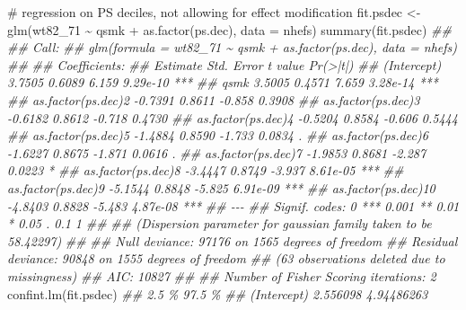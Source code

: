 \documentclass[
  10pt,
  a4paper,
]{book}
\newenvironment{Shaded}{\begin{snugshade}}{\end{snugshade}}
\newcommand{\AttributeTok}[1]{\textcolor[rgb]{0.40,0.45,0.13}{#1}}
\newcommand{\CommentTok}[1]{\textcolor[rgb]{0.37,0.37,0.37}{#1}}
\newcommand{\DocumentationTok}[1]{\textcolor[rgb]{0.37,0.37,0.37}{\textit{#1}}}
\newcommand{\FunctionTok}[1]{\textcolor[rgb]{0.28,0.35,0.67}{#1}}
\newcommand{\NormalTok}[1]{\textcolor[rgb]{0.00,0.46,0.62}{#1}}
\newcommand{\OtherTok}[1]{\textcolor[rgb]{0.00,0.46,0.62}{#1}}
\newcommand{\SpecialCharTok}[1]{\textcolor[rgb]{0.37,0.37,0.37}{#1}}
\begin{document}
\begin{Shaded}
\begin{Highlighting}[]
\CommentTok{\# regression on PS deciles, not allowing for effect modification}
\NormalTok{fit.psdec }\OtherTok{\textless{}{-}} \FunctionTok{glm}\NormalTok{(wt82\_71 }\SpecialCharTok{\textasciitilde{}}\NormalTok{ qsmk }\SpecialCharTok{+} \FunctionTok{as.factor}\NormalTok{(ps.dec), }\AttributeTok{data =}\NormalTok{ nhefs)}
\FunctionTok{summary}\NormalTok{(fit.psdec)}
\DocumentationTok{\#\# }
\DocumentationTok{\#\# Call:}
\DocumentationTok{\#\# glm(formula = wt82\_71 \textasciitilde{} qsmk + as.factor(ps.dec), data = nhefs)}
\DocumentationTok{\#\# }
\DocumentationTok{\#\# Coefficients:}
\DocumentationTok{\#\#                     Estimate Std. Error t value Pr(\textgreater{}|t|)    }
\DocumentationTok{\#\# (Intercept)           3.7505     0.6089   6.159 9.29e{-}10 ***}
\DocumentationTok{\#\# qsmk                  3.5005     0.4571   7.659 3.28e{-}14 ***}
\DocumentationTok{\#\# as.factor(ps.dec)2   {-}0.7391     0.8611  {-}0.858   0.3908    }
\DocumentationTok{\#\# as.factor(ps.dec)3   {-}0.6182     0.8612  {-}0.718   0.4730    }
\DocumentationTok{\#\# as.factor(ps.dec)4   {-}0.5204     0.8584  {-}0.606   0.5444    }
\DocumentationTok{\#\# as.factor(ps.dec)5   {-}1.4884     0.8590  {-}1.733   0.0834 .  }
\DocumentationTok{\#\# as.factor(ps.dec)6   {-}1.6227     0.8675  {-}1.871   0.0616 .  }
\DocumentationTok{\#\# as.factor(ps.dec)7   {-}1.9853     0.8681  {-}2.287   0.0223 *  }
\DocumentationTok{\#\# as.factor(ps.dec)8   {-}3.4447     0.8749  {-}3.937 8.61e{-}05 ***}
\DocumentationTok{\#\# as.factor(ps.dec)9   {-}5.1544     0.8848  {-}5.825 6.91e{-}09 ***}
\DocumentationTok{\#\# as.factor(ps.dec)10  {-}4.8403     0.8828  {-}5.483 4.87e{-}08 ***}
\DocumentationTok{\#\# {-}{-}{-}}
\DocumentationTok{\#\# Signif. codes:  0 \textquotesingle{}***\textquotesingle{} 0.001 \textquotesingle{}**\textquotesingle{} 0.01 \textquotesingle{}*\textquotesingle{} 0.05 \textquotesingle{}.\textquotesingle{} 0.1 \textquotesingle{} \textquotesingle{} 1}
\DocumentationTok{\#\# }
\DocumentationTok{\#\# (Dispersion parameter for gaussian family taken to be 58.42297)}
\DocumentationTok{\#\# }
\DocumentationTok{\#\#     Null deviance: 97176  on 1565  degrees of freedom}
\DocumentationTok{\#\# Residual deviance: 90848  on 1555  degrees of freedom}
\DocumentationTok{\#\#   (63 observations deleted due to missingness)}
\DocumentationTok{\#\# AIC: 10827}
\DocumentationTok{\#\# }
\DocumentationTok{\#\# Number of Fisher Scoring iterations: 2}
\FunctionTok{confint.lm}\NormalTok{(fit.psdec)}
\DocumentationTok{\#\#                         2.5 \%      97.5 \%}
\DocumentationTok{\#\# (Intercept)          2.556098  4.94486263}

\end{Highlighting}
\end{Shaded}
\end{document}
